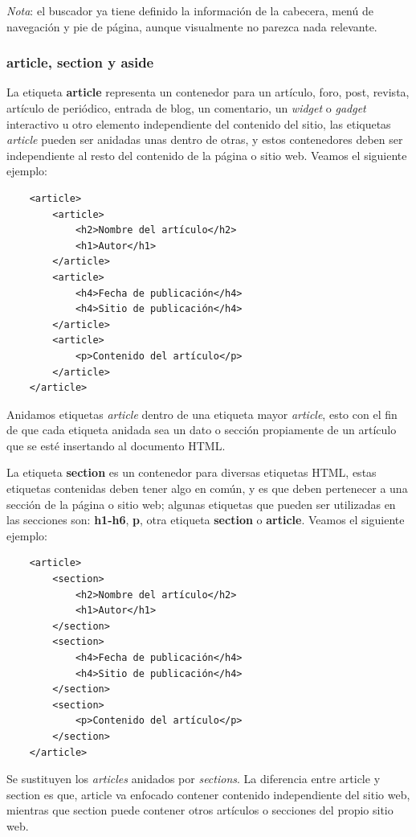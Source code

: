 \textit{Nota}: el buscador ya tiene definido la información de la cabecera, menú de navegación y pie de página, aunque visualmente no parezca nada relevante.


\subsubsection{article, section y aside}

La etiqueta \textbf{article} representa un contenedor para un artículo, foro, post, revista, artículo de periódico, entrada de blog, un comentario, un \textit{widget} o \textit{gadget} interactivo u otro elemento independiente del contenido del sitio, las etiquetas \textit{article} pueden ser anidadas unas dentro de otras, y estos contenedores deben ser independiente al resto del contenido de la página o sitio web. Veamos el siguiente ejemplo:
\begin{lstlisting}
    <article>
        <article>
            <h2>Nombre del artículo</h2>
            <h1>Autor</h1>
        </article>
        <article>
            <h4>Fecha de publicación</h4>
            <h4>Sitio de publicación</h4>
        </article>
        <article>
            <p>Contenido del artículo</p>
        </article>
    </article>
\end{lstlisting}

Anidamos etiquetas \textit{article} dentro de una etiqueta mayor \textit{article}, esto con el fin de que cada etiqueta anidada sea un dato o sección propiamente de un artículo que se esté insertando al documento HTML.

La etiqueta \textbf{section} es un contenedor para diversas etiquetas HTML, estas etiquetas contenidas deben tener algo en común, y es que deben pertenecer a una sección de la página o sitio web; algunas etiquetas que pueden ser utilizadas en las secciones son: \textbf{h1-h6}, \textbf{p}, otra etiqueta \textbf{section} o \textbf{article}. Veamos el siguiente ejemplo:
\begin{lstlisting}
    <article>
        <section>
            <h2>Nombre del artículo</h2>
            <h1>Autor</h1>
        </section>
        <section>
            <h4>Fecha de publicación</h4>
            <h4>Sitio de publicación</h4>
        </section>
        <section>
            <p>Contenido del artículo</p>
        </section>
    </article>
\end{lstlisting}

Se sustituyen los \textit{articles} anidados por \textit{sections}. La diferencia entre article y section es que, article va enfocado contener contenido independiente del sitio web, mientras que section puede contener otros artículos o secciones del propio sitio web.

